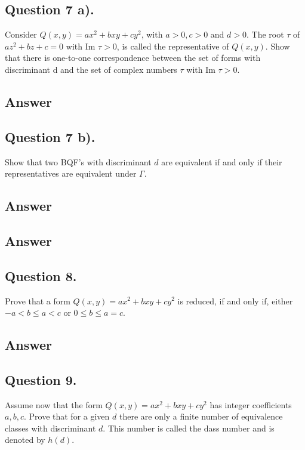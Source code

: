 \subsection{Question 7 a).}
\noindent
Consider $Q(x,y)=a x^2 + b x y +c y^2$, with $a>0, c>0$ and $d>0$. The root $\tau$ of $a z^2 + b z + c = 0$ with
Im $\tau > 0$, is called the representative of $Q(x,y)$. Show that there is one-to-one correspondence between the
set of forms with discriminant d and the set of complex numbers $\tau$ with Im $\tau > 0$.

\subsection*{Answer}
\noindent
[TBD]


\subsection{Question 7 b).}
\noindent
Show that two BQF's with discriminant $d$ are equivalent if and only if their representatives are equivalent under $\Gamma$.
\subsection*{Answer}
\noindent
[TBD]

\subsection*{Answer}
\noindent
[TBD]


\subsection{Question 8.}
\noindent
Prove that a form $Q(x,y) = a x^2 + b x y +c y^2$ is reduced, if and only if, either $-a < b \leq a < c$ or
$0 \leq b \leq a = c$.

\subsection*{Answer}
\noindent
[TBD]


\subsection{Question 9.}
\noindent
Assume now that the form $Q(x, y) = a x^2 + b x y + c y^2$ has integer coefficients $a, b, c$.
Prove that for a given $d$ there are only a finite number of equivalence classes  with discriminant $d$.
This number is called the dass number and is denoted by $h(d)$.

